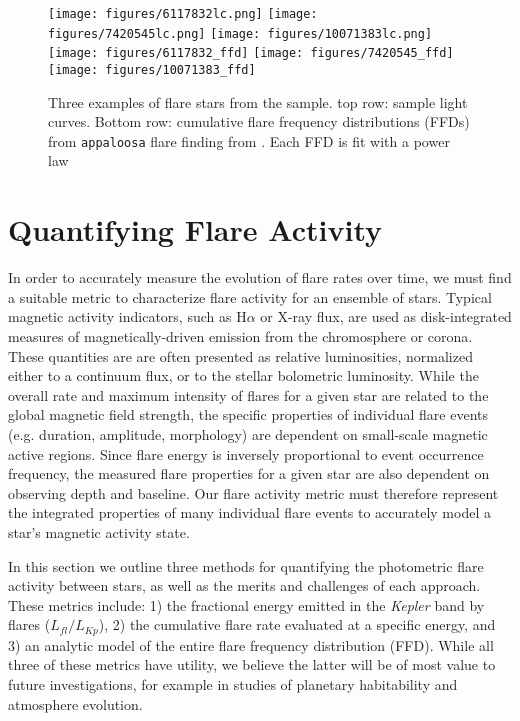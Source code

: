 \documentclass[preprint2]{aastex62}
\newcommand{\Kepler}{\textsl{Kepler}\xspace}
\begin{document}


\begin{figure*}[!t]
\centering
\texttt{[image: figures/6117832lc.png]}
\texttt{[image: figures/7420545lc.png]}
\texttt{[image: figures/10071383lc.png]}\\
\texttt{[image: figures/6117832\_ffd]}
\texttt{[image: figures/7420545\_ffd]}
\texttt{[image: figures/10071383\_ffd]}
\caption{
Three examples of flare stars from the \citet{davenport2016} sample. top row: sample light curves. Bottom row: cumulative flare frequency distributions (FFDs) from {\tt appaloosa} flare finding from \citet{davenport2016}. Each FFD is fit with a power law
}
\label{fig:ffd1}
\end{figure*}





\section{Quantifying Flare Activity}
\label{sec:activity}

In order to accurately measure the evolution of flare rates over time, we must find a suitable metric to characterize flare activity for an ensemble of stars. Typical magnetic activity indicators, such as H$\alpha$ or X-ray flux, are used as disk-integrated measures of magnetically-driven emission from the chromosphere or corona. These quantities are are often presented as relative luminosities, normalized either to a continuum flux, or to the stellar bolometric luminosity.  While the overall rate and maximum intensity of flares for a given star are related to the global magnetic field strength, the specific properties of individual flare events  (e.g. duration, amplitude, morphology) are dependent on small-scale magnetic active regions. Since flare energy is inversely proportional to event occurrence frequency, the measured flare properties for a given star are also dependent on observing depth and baseline. Our flare activity metric must therefore represent the integrated properties of many individual flare events to accurately model a star's magnetic activity state.


In this section we outline three methods for quantifying the photometric flare activity between stars, as well as the merits and challenges of each approach. These metrics include: 1) the fractional energy emitted in the \Kepler band by flares ($L_{fl}/L_{Kp}$), 2) the cumulative flare rate evaluated at a specific energy, and 3) an analytic model of the entire flare frequency distribution (FFD). While all three of these metrics have utility, we believe the latter will be of most value to future investigations, for example in studies of planetary habitability and atmosphere evolution. 
\end{document}

